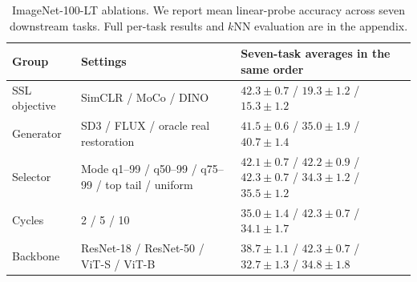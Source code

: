 \begin{table}[t]
\centering
\footnotesize
\setlength{\tabcolsep}{4pt}
\caption{ImageNet-100-LT ablations. We report mean linear-probe accuracy across seven downstream tasks. Full per-task results and $k$NN evaluation are in the appendix.}
\label{tab:main_ablation_combined}
\begin{tabular}{lll}
\toprule
Group & Settings & Seven-task averages in the same order \\
\midrule
SSL objective & SimCLR / MoCo / DINO & $42.3\pm0.7$ / $19.3\pm1.2$ / $15.3\pm1.2$ \\
Generator & SD3 / FLUX / oracle real restoration & $41.5\pm0.6$ / $35.0\pm1.9$ / $40.7\pm1.4$ \\
Selector & Mode q1--99 / q50--99 / q75--99 / top tail / uniform & $42.1\pm0.7$ / $42.2\pm0.9$ / $42.3\pm0.7$ / $34.3\pm1.2$ / $35.5\pm1.2$ \\
Cycles & 2 / 5 / 10 & $35.0\pm1.4$ / $42.3\pm0.7$ / $34.1\pm1.7$ \\
Backbone & ResNet-18 / ResNet-50 / ViT-S / ViT-B & $38.7\pm1.1$ / $42.3\pm0.7$ / $32.7\pm1.3$ / $34.8\pm1.8$ \\
\bottomrule
\end{tabular}
\end{table}
